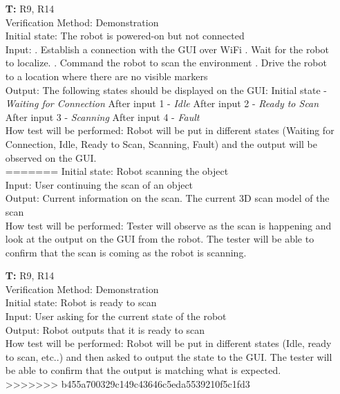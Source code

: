 \documentclass[12pt, titlepage]{article}
\newcounter{tnum} %
\begin{document}
\begin{itemize}
\item[\textbf{T\refstepcounter{tnum}\thetnum:}]{R9, R14\\}
Verification Method: Demonstration\\
Initial state: The robot is powered-on but not connected\\
Input: 
. Establish a connection with the GUI over WiFi . Wait for the robot to localize.
. Command the robot to scan the environment
. Drive the robot to a location where there are no visible markers\\
Output: The following states should be displayed on the GUI:
\newline Initial state - \textit{Waiting for Connection} \newline After input 1 - \textit{Idle} 
\newline After input 2 - \textit{Ready to Scan} 
\newline After input 3 - \textit{Scanning}
\newline After input 4 - \textit{Fault}  \\
How test will be performed: Robot will be put in different states (Waiting for Connection, Idle, Ready to Scan, Scanning, Fault) and the output will be observed on the GUI. \\
=======
Initial state: Robot scanning the object\\
Input: User continuing the scan of an object \\
Output: Current information on the scan. The current 3D scan model of the scan\\
How test will be performed: Tester will observe as the scan is happening and look at the output on the GUI from the robot. The tester will be able to confirm that the scan is coming as the robot is scanning.\\

\item[\textbf{T\refstepcounter{tnum}\thetnum:}]{R9, R14\\}
Verification Method: Demonstration\\
Initial state: Robot is ready to scan\\
Input: User asking for the current state of the robot\\
Output: Robot outputs that it is ready to scan\\
How test will be performed: Robot will be put in different states (Idle, ready to scan, etc..) and then asked to output the state to the GUI. The tester will be able to confirm that the output is matching what is expected. \\
>>>>>>> b455a700329c149c43646c5eda5539210f5c1fd3

\end{itemize}
\end{document}
